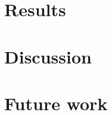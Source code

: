 \documentclass[conference]{IEEEtran}
\begin{document}
\section{Results}
\section{Discussion}
\section{Future work}
%
%



%
%
\end{document}
